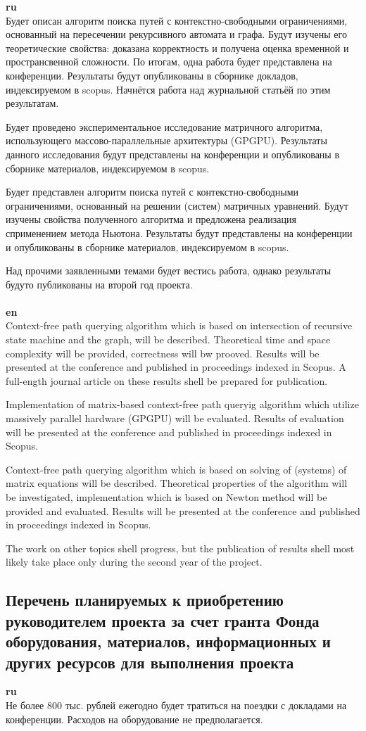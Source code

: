 \documentclass[12pt]{article}  %
\theoremstyle{remark}
\begin{document}
\textbf{ru}\\
%
Будет описан алгоритм поиска путей с контекстно-свободными ограничениями, основанный на пересечении рекурсивного автомата и графа. Будут изучены его теоретические свойства: доказана корректность и получена оценка временной и пространсвенной сложности.
По итогам, одна работа будет представлена на конференции. Результаты будут опубликованы в сборнике докладов, индексируемом в scopus.
Начнётся работа над журнальной статьёй по этим результатам.

Будет проведено экспериментальное исследование матричного алгоритма, использующего массово-параллельные архитектуры (GPGPU).
Результаты данного исследования будут представлены на конференции и опубликованы в сборнике материалов, индексируемом в scopus.

Будет представлен алгоритм поиска путей с контекстно-свободными ограничениями, основанный на решении (систем) матричных уравнений.
Будут изучены свойства полученного алгоритма и предложена реализация сприменением метода Ньютона.
Результаты будут представлены на конференции и опубликованы в сборнике материалов, индексируемом в scopus.

Над прочими заявленными темами будет вестись работа, однако результаты будуто публикованы на второй год проекта.
\\
\\
\textbf{en}\\
Context-free path querying algorithm which is based on intersection of recursive state machine and the graph, will be described.
Theoretical time and space complexity will be provided, correctness will bw prooved.
Results will be presented at the conference and published in proceedings indexed in Scopus.
A full-ength journal article on these results shell be prepared for publication.

Implementation of matrix-based context-free path queryig algorithm which utilize massively parallel hardware (GPGPU) will be evaluated.
Results of evaluation will be presented at the conference and published in proceedings indexed in Scopus.

Context-free path querying algorithm which is based on solving of (systems) of matrix equations will be described.
Theoretical properties of the algorithm will be investigated, implementation which is based on Newton method will be provided and evaluated.
Results will be presented at the conference and published in proceedings indexed in Scopus.

The work on other topics shell progress, but the publication of results shell most likely take place only during the second year of the project.

\subsection{Перечень планируемых к приобретению руководителем проекта за счет гранта Фонда оборудования, материалов, информационных и других ресурсов для выполнения проекта}

\textbf{ru}\\
%
Не более 800 тыс. рублей ежегодно будет тратиться на поездки с докладами на конференции. Расходов на оборудование не предполагается.
\end{document}
